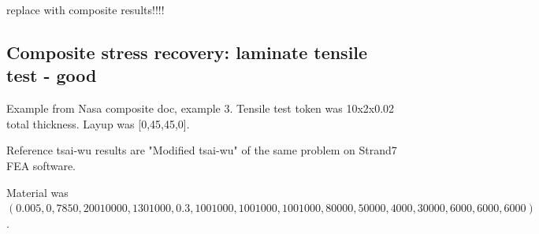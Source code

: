 replace with composite results!!!!

\subsection{Composite stress recovery: laminate tensile test - good}

Example from Nasa composite doc, example 3. Tensile test token was 10x2x0.02 total thickness. Layup was [0,45,45,0].

Reference tsai-wu results are "Modified tsai-wu" of the same problem on Strand7 FEA software.

Material was $(0.005,0,7850,20010000,1301000,0.3,1001000,1001000,1001000,80000,50000,4000,30000,6000,6000,6000)$.

\begin{figure}[H]
	\\
\end{figure}
